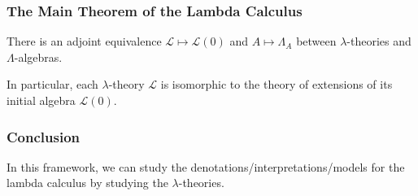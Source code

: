 \documentclass[aspectratio=169]{fancyslides} %
\begin{document}
  \begin{frame}
    \frametitle{The Main Theorem of the Lambda Calculus}
    \begin{theorem}
      There is an adjoint equivalence $ \mathcal L \mapsto \mathcal L(0) $ and $ A \mapsto \Lambda_A $ between $ \lambda $-theories and  $ \Lambda $-algebras.

      In particular, each $ \lambda $-theory $ \mathcal L $ is isomorphic to the theory of extensions of its initial algebra $ \mathcal L(0) $.
    \end{theorem}
  \end{frame}

  \begin{frame}
    \frametitle{Conclusion}

    In this framework, we can study the denotations/interpretations/models for the lambda calculus by studying the $ \lambda $-theories.
  \end{frame}
\end{document}
